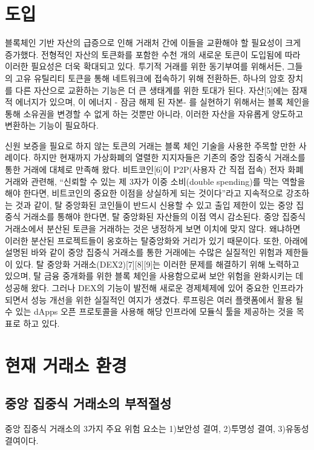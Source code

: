 \documentclass{article}
\begin{document}
\begin{multicols}{2}
\section{도입\label{sec:introduction}}

블록체인 기반 자산의 급증으로 인해 거래처 간에 이들을 교환해야 할 필요성이 크게 증가했다. 전형적인 자산의 토큰화를 포함한 수천 개의 새로운 토큰이 도입됨에 따라 이러한 필요성은 더욱 확대되고 있다. 투기적 거래를 위한 동기부여를 위해서든, 그들의 고유 유틸리티 토큰을 통해 네트워크에 접속하기 위해 전환하든, 하나의 암호 장치를 다른 자산으로 교환하는 기능은 더 큰 생태계를 위한 토대가 된다. 자산[5]에는 잠재적 에너지가 있으며, 이 에너지 - 잠금 해제 된 자본- 를 실현하기 위해서는 블록 체인을 통해 소유권을 변경할 수 없게 하는 것뿐만 아니라, 이러한 자산을 자유롭게 양도하고 변환하는 기능이 필요하다. 

신원 보증을 필요로 하지 않는 토큰의 거래는 블록 체인 기술을 사용한 주목할 만한 사례이다. 하지만 현재까지 가상화폐의 열렬한 지지자들은 기존의 중앙 집중식 거래소를 통한 거래에 대체로 만족해 왔다. 비트코인[6]이 P2P(사용자 간 직접 접속) 전자 화폐 거래와 관련해, “신뢰할 수 있는 제 3자가 이중 소비(double spending)를 막는 역할을 해야 한다면, 비트코인의 중요한 이점을 상실하게 되는 것이다”라고 지속적으로 강조하는 것과 같이, 탈 중앙화된 코인들이 반드시 신용할 수 있고 출입 제한이 있는 중앙 집중식 거래소를 통해야 한다면, 탈 중앙화된 자산들의 이점 역시 감소된다. 중앙 집중식 거래소에서 분산된 토큰을 거래하는 것은 냉정하게 보면 이치에 맞지 않다. 왜냐하면 이러한 분산된 프로젝트들이 옹호하는 탈중앙화와 거리가 있기 때문이다. 또한, 아래에 설명된 바와 같이 중앙 집중식 거래소를 통한 거래에는 수많은 실질적인 위험과 제한들이 있다. 탈 중앙화 거래소(DEX2)[7][8][9]는 이러한 문제를 해결하기 위해 노력하고 있으며, 탈 금융 중개화를 위한 블록 체인을 사용함으로써 보안 위험을 완화시키는 데 성공해 왔다. 그러나 DEX의 기능이 발전해 새로운 경제체제에 있어 중요한 인프라가 되면서 성능 개선을 위한 실질적인 여지가 생겼다. 루프링은 여러 플랫폼에서 활용 될 수 있는 dApps 오픈 프로토콜을 사용해 해당 인프라에 모듈식 툴을 제공하는 것을 목표로 하고 있다.

	
	
\section{현재 거래소 환경\label{sec:current_exchange_landscape}}

\subsection{중앙 집중식 거래소의 부적절성}
중앙 집중식 거래소의 3가지 주요 위험 요소는 1)보안성 결여, 2)투명성 결여, 3)유동성 결여이다. 


\end{multicols}
\end{document}
